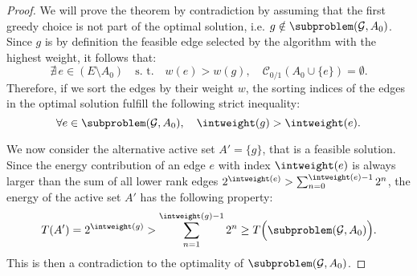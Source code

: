 \begin{proof}

\noindent We will prove the theorem by contradiction by assuming that the first greedy choice is not part of the optimal solution, i.e. $g \notin \subproblem(\mathcal{G},A_0)$.\\
Since $g$ is by definition the feasible edge selected by the algorithm with the highest weight, it follows that:
\begin{equation}
\nexists\, e \in (E \setminus A_0) \quad \text{s. t.} \quad w(e) > w(g), \quad \mathcal{C}_{0/1}(A_0 \cup \{e\}) = \emptyset.
\end{equation}
Therefore, if we sort the edges by their weight $w$, the sorting indices of the edges in the optimal solution fulfill the following strict inequality:
\begin{equation} \label{eq:strict_index_ineq}
\forall e \in \subproblem(\mathcal{G},A_0), \quad \intweight(g) > \intweight(e).
\end{equation}


We now consider the alternative active set $A' = \{g\}$, that is a feasible solution. Since the energy contribution of an edge $e$ with index $\intweight(e)$ is always larger than the sum of all lower rank edges ${2^{\intweight(e)} > \sum_{n=0}^{\intweight(e)-1} 2^n}$, the energy of the active set $A'$ has the following property:
\begin{equation}
T(A') = 2^{\intweight(g)} > \sum_{n=1}^{\intweight(g)-1} 2^n \ge T\Big(\subproblem(\mathcal{G},A_0)\Big).
\end{equation}
This is then a contradiction to the optimality of $\subproblem(\mathcal{G},A_0)$.
\end{proof}

